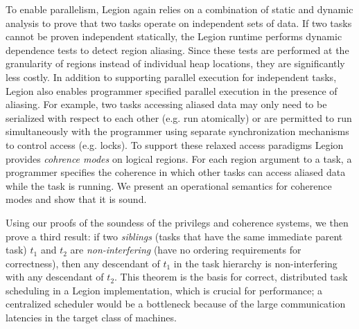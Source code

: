 To enable parallelism, Legion again relies on a combination of static and dynamic
analysis to prove that two tasks operate on independent sets of data.  If two tasks
cannot be proven independent statically, the Legion runtime performs dynamic dependence
tests to detect region aliasing.  Since these tests are performed at the granularity of
regions instead of individual heap locations, they are significantly less costly.
In addition to supporting parallel execution for independent tasks, Legion also enables
programmer specified parallel execution in the presence of aliasing.  For example, two tasks 
accessing aliased data may only need to be serialized
with respect to each other (e.g. run atomically) or are permitted to run
simultaneously with the programmer using separate synchronization mechanisms
to control access (e.g. locks).  To support these relaxed access paradigms 
Legion provides {\em cohrence modes} on logical regions.  For each region
argument to a task, a programmer specifies the coherence in which other tasks
can access aliased data while the task is running.  We present an operational semantics
for coherence modes and show that it is sound.

Using our proofs of the soundess of the privilegs and coherence systems, we then 
prove a third result: if two {\em siblings} (tasks that
have the same immediate parent task) $t_1$ and $t_2$ are 
{\em non-interfering} (have no ordering requirements for correctness), 
then any descendant of $t_1$ in the task hierarchy is non-interfering
with any descendant of $t_2$.  This theorem is the basis for correct, distributed
task scheduling in a Legion implementation, which is crucial for
performance; a centralized scheduler would be a bottleneck
because of the large communication latencies in the target
class of machines.




